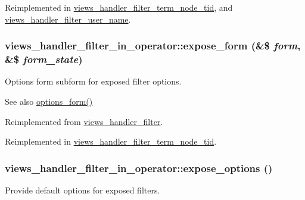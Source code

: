 Reimplemented in \hyperlink{classviews__handler__filter__term__node__tid_a392046588b13b1b76223eb22ba4ff660}{views\_\-handler\_\-filter\_\-term\_\-node\_\-tid}, and \hyperlink{classviews__handler__filter__user__name_aba7659d0d6c937d9c346e8ed3af532b6}{views\_\-handler\_\-filter\_\-user\_\-name}.\hypertarget{classviews__handler__filter__in__operator_a23bfbd98ea5838480365b21e952bf9f4}{
\subsubsection[{expose\_\-form}]{\setlength{\rightskip}{0pt plus 5cm}views\_\-handler\_\-filter\_\-in\_\-operator::expose\_\-form (\&\$ {\em form}, \/  \&\$ {\em form\_\-state})}}
\label{classviews__handler__filter__in__operator_a23bfbd98ea5838480365b21e952bf9f4}
Options form subform for exposed filter options.

\begin{DoxySeeAlso}{See also}
\hyperlink{classviews__handler__filter_af14c69367162057a32709a6340de0988}{options\_\-form()} 
\end{DoxySeeAlso}


Reimplemented from \hyperlink{classviews__handler__filter_a9537c9a30fb9008361efdfdde46633cd}{views\_\-handler\_\-filter}.

Reimplemented in \hyperlink{classviews__handler__filter__term__node__tid_abf972bb53512f371af5c1ec32048f686}{views\_\-handler\_\-filter\_\-term\_\-node\_\-tid}.\hypertarget{classviews__handler__filter__in__operator_a0ed328117721ce41a3744f0339c16527}{
\subsubsection[{expose\_\-options}]{\setlength{\rightskip}{0pt plus 5cm}views\_\-handler\_\-filter\_\-in\_\-operator::expose\_\-options ()}}
\label{classviews__handler__filter__in__operator_a0ed328117721ce41a3744f0339c16527}
Provide default options for exposed filters. 

